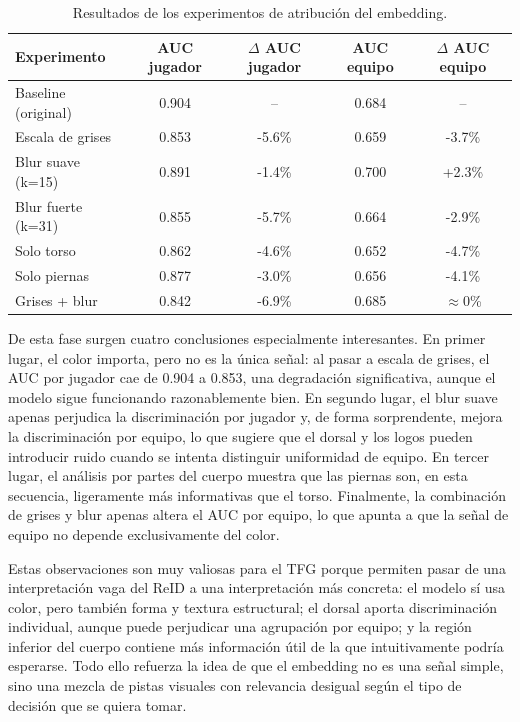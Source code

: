 \documentclass[../MAIN.tex]{subfiles}
\begin{document}
	\begin{table}[H]
		\centering
		\caption{Resultados de los experimentos de atribución del embedding.}
		\label{tab:cap8_atribucion}
		\begin{tabular}{lcccc}
			\toprule
			\textbf{Experimento} & \textbf{AUC jugador} & \textbf{$\Delta$ AUC jugador} & \textbf{AUC equipo} & \textbf{$\Delta$ AUC equipo} \\
			\midrule
			Baseline (original)   & 0.904 & --      & 0.684 & -- \\
			Escala de grises      & 0.853 & -5.6\%  & 0.659 & -3.7\% \\
			Blur suave (k=15)     & 0.891 & -1.4\%  & 0.700 & +2.3\% \\
			Blur fuerte (k=31)    & 0.855 & -5.7\%  & 0.664 & -2.9\% \\
			Solo torso            & 0.862 & -4.6\%  & 0.652 & -4.7\% \\
			Solo piernas          & 0.877 & -3.0\%  & 0.656 & -4.1\% \\
			Grises + blur         & 0.842 & -6.9\%  & 0.685 & $\approx$0\% \\
			\bottomrule
		\end{tabular}
	\end{table}
	
	De esta fase surgen cuatro conclusiones especialmente interesantes. En primer lugar, el color importa, pero no es la única señal: al pasar a escala de grises, el AUC por jugador cae de 0.904 a 0.853, una degradación significativa, aunque el modelo sigue funcionando razonablemente bien. En segundo lugar, el blur suave apenas perjudica la discriminación por jugador y, de forma sorprendente, mejora la discriminación por equipo, lo que sugiere que el dorsal y los logos pueden introducir ruido cuando se intenta distinguir uniformidad de equipo. En tercer lugar, el análisis por partes del cuerpo muestra que las piernas son, en esta secuencia, ligeramente más informativas que el torso. Finalmente, la combinación de grises y blur apenas altera el AUC por equipo, lo que apunta a que la señal de equipo no depende exclusivamente del color.
	
	Estas observaciones son muy valiosas para el TFG porque permiten pasar de una interpretación vaga del ReID a una interpretación más concreta: el modelo sí usa color, pero también forma y textura estructural; el dorsal aporta discriminación individual, aunque puede perjudicar una agrupación por equipo; y la región inferior del cuerpo contiene más información útil de la que intuitivamente podría esperarse. Todo ello refuerza la idea de que el embedding no es una señal simple, sino una mezcla de pistas visuales con relevancia desigual según el tipo de decisión que se quiera tomar.
	
\end{document}

